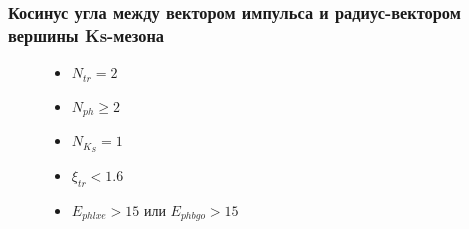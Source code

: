 \documentclass[14pt, hyperref = {colorlinks}]{beamer}
\begin{document}
\begin{frame}
\frametitle{Косинус угла между вектором импульса и радиус-вектором вершины Ks-мезона}
\begin{figure}[h]
\begin{minipage}[h]{0.69\linewidth}
\end{minipage}
\begin{minipage}[h]{0.29\linewidth}
    \begin{itemize}
        \item {$N_{tr} = 2$}
        \item {$N_{ph} \geq 2$}
        \item {$N_{K_{S}} = 1$}
        \item {$\xi_{tr} < 1.6$}
        \item {$E_{phlxe} > 15$ или $E_{phbgo} > 15$}
    \end{itemize}
\end{minipage}
\hfill
\end{figure}
\end{frame}
\end{document}
